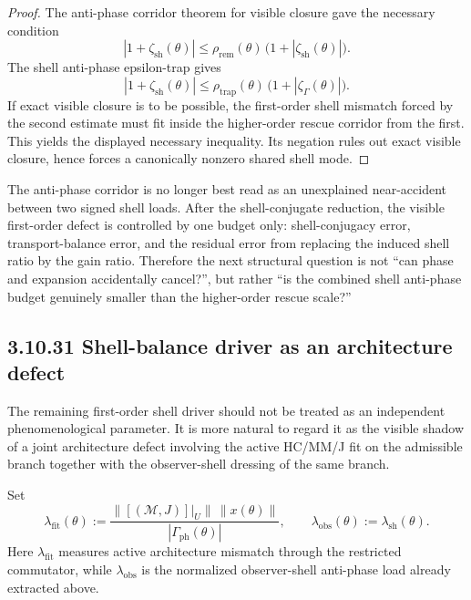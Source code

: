 \begin{proof}
The anti-phase corridor theorem for visible closure gave the necessary condition
\[
  |1+\zeta_{\mathrm{sh}}(\theta)|
  \le
  \rho_{\mathrm{rem}}(\theta)\,\bigl(1+|\zeta_{\mathrm{sh}}(\theta)|\bigr).
\]
The shell anti-phase epsilon-trap gives
\[
  |1+\zeta_{\mathrm{sh}}(\theta)|
  \le
  \rho_{\mathrm{trap}}(\theta)\,\bigl(1+|\zeta_{\Gamma}(\theta)|\bigr).
\]
If exact visible closure is to be possible, the first-order shell mismatch forced by the second estimate must fit inside the higher-order rescue corridor from the first. This yields the displayed necessary inequality. Its negation rules out exact visible closure, hence forces a canonically nonzero shared shell mode.
\end{proof}

\begin{remark}
The anti-phase corridor is no longer best read as an unexplained near-accident between two signed shell loads. After the shell-conjugate reduction, the visible first-order defect is controlled by one budget only: shell-conjugacy error, transport-balance error, and the residual error from replacing the induced shell ratio by the gain ratio. Therefore the next structural question is not ``can phase and expansion accidentally cancel?'', but rather ``is the combined shell anti-phase budget genuinely smaller than the higher-order rescue scale?''
\end{remark}



\subsection*{3.10.31 Shell-balance driver as an architecture defect}
The remaining first-order shell driver should not be treated as an independent phenomenological parameter. It is more natural to regard it as the visible shadow of a joint architecture defect involving the active HC/MM/J fit on the admissible branch together with the observer-shell dressing of the same branch.

\begin{definition}
Set
\[
  \lambda_{\mathrm{fit}}(\theta)
  :=
  \frac{\|[(\mathcal M,J)]|_{U}\|\,\|x(\theta)\|}{|\Gamma_{\mathrm{ph}}(\theta)|},
  \qquad
  \lambda_{\mathrm{obs}}(\theta):=\lambda_{\mathrm{sh}}(\theta).
\]
Here \(\lambda_{\mathrm{fit}}\) measures active architecture mismatch through the restricted commutator, while \(\lambda_{\mathrm{obs}}\) is the normalized observer-shell anti-phase load already extracted above.
\end{definition}

